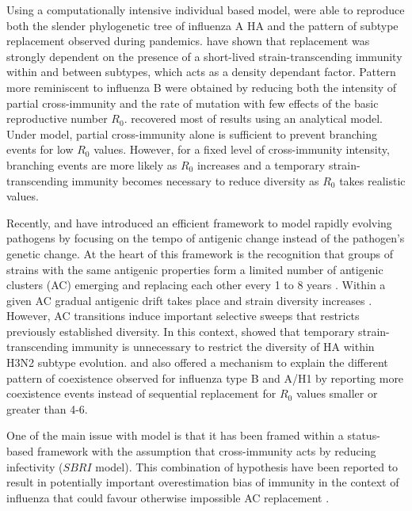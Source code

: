 Using a computationally intensive individual based model,
\citet{Ferguson2003} were able to reproduce both the slender
phylogenetic tree of influenza A HA and the pattern of subtype
replacement observed during pandemics. \citet{Ferguson2003} have shown
that replacement was strongly dependent on the presence of a
short-lived strain-transcending immunity within and between subtypes,
which acts as a density dependant factor. Pattern more reminiscent to
influenza B were obtained by reducing both the intensity of partial
cross-immunity and the rate of mutation with few effects of the basic
reproductive number $R_0$.
%
\citet{Andreasen2006} recovered most of \citet{Ferguson2003} results
using an analytical model. Under \citet{Andreasen2006} model, partial
cross-immunity alone is sufficient to prevent branching events for low
$R_{0}$ values. However, for a fixed level of cross-immunity
intensity, branching events are more likely as $R_{0}$ increases and a
temporary strain-transcending immunity becomes necessary to reduce
diversity as $R_{0}$ takes realistic values.

Recently, \citet{Koelle2006} and \citet{Koelle2009} have introduced an
efficient framework to model rapidly evolving pathogens by focusing on
the tempo of antigenic change instead of the pathogen's genetic
change. At the heart of this framework is the recognition that groups
of strains with the same antigenic properties form a limited number of
antigenic clusters (AC) emerging and replacing each other every 1 to 8
years \citep{Smith2004}. Within a given AC gradual antigenic drift
takes place and strain diversity increases \citep{Shih2007,
  Suzuki2008, Russell2008}. However, AC transitions induce important
selective sweeps that restricts previously established diversity. In
this context, \citet{Koelle2006} showed that temporary
strain-transcending immunity is unnecessary to restrict the diversity
of HA within H3N2 subtype evolution. \citet{Koelle2006} and
\citet{Koelle2009} also offered a mechanism to explain the different
pattern of coexistence observed for influenza type B and A/H1 by
reporting more coexistence events instead of sequential replacement
for $R_0$ values smaller or greater than 4-6.

One of the main issue with \citet{Koelle2006} model is that it has
been framed within a status-based framework with the assumption that
cross-immunity acts by reducing infectivity ($SBRI$ model). This
combination of hypothesis have been reported to result in potentially
important overestimation bias of immunity in the context of influenza
that could favour otherwise impossible AC replacement
\citep{Ballesteros2009}.

